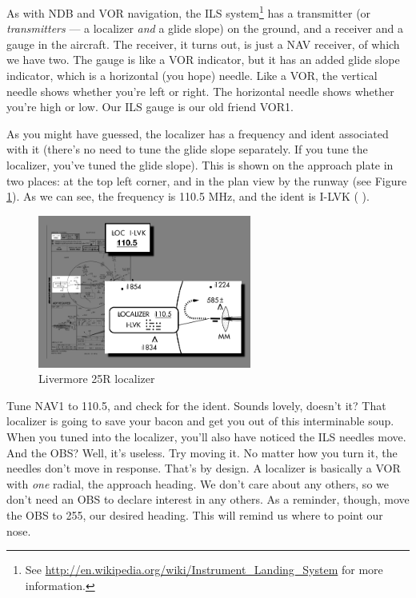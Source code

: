 As with NDB and VOR navigation, the ILS system\footnote{See
  \url{http://en.wikipedia.org/wiki/Instrument_Landing_System} for
  more information.} has a transmitter (or \emph{transmitters} --- a
localizer \emph{and} a glide slope) on the ground, and a receiver and
a gauge in the aircraft.  The receiver, it turns out, is just a NAV
receiver, of which we have two.  The gauge is like a VOR indicator,
but it has an added glide slope indicator, which is a horizontal (you
hope) needle.  Like a VOR, the vertical needle shows whether you're
left or right.  The horizontal needle shows whether you're high or
low.  Our ILS gauge is our old friend VOR1.

As you might have guessed, the localizer has a frequency and ident
associated with it (there's no need to tune the glide slope
separately.  If you tune the localizer, you've tuned the glide slope).
This is shown on the approach plate in two places: at the top left
corner, and in the plan view by the runway (see Figure
\ref{fig:localizer}).  As we can see, the frequency is 110.5 MHz, and
the ident is I-LVK (\mdot\mdot\mspace \mdot\mdash\mdot\mdot\mspace
\mdot\mdot\mdot\mdash\mspace \mdash\mdot\mdash).


\begin{figure}
  \begin{center}
    \includegraphics[width=7cm]{img/localizer}
    \caption{Livermore 25R localizer}
    \label{fig:localizer}
  \end{center}
\end{figure}

Tune NAV1 to 110.5, and check for the ident.  Sounds lovely, doesn't
it?  That localizer is going to save your bacon and get you out of
this interminable soup.  When you tuned into the localizer, you'll
also have noticed the ILS needles move.  And the OBS?  Well, it's
useless.  Try moving it.  No matter how you turn it, the needles don't
move in response.  That's by design.  A localizer is basically a VOR
with \emph{one} radial, the approach heading.  We don't care about any
others, so we don't need an OBS to declare interest in any others.  As
a reminder, though, move the OBS to 255, our desired heading.  This
will remind us where to point our nose.

